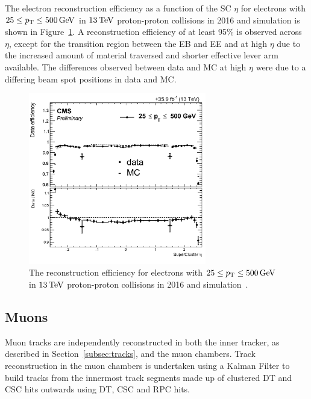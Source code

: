 The electron reconstruction efficiency as a function of the SC $\eta$ for electrons with $25 \leq p_{\mathrm{T}} \leq 500\,\text{Ge\hspace{-.08em}V}$ in $13\,\text{Te\hspace{-.08em}V}$ proton-proton collisions in 2016 and simulation is shown in Figure~\ref{fig:electronRecoEff}.
A reconstruction efficiency of at least 95\% is observed across $\eta$, except for the transition region between the EB and EE and at high $\eta$ due to the increased amount of material traversed and shorter effective lever arm available.
The differences observed between data and MC at high $\eta$ were due to a differing beam spot positions in data and MC.

\begin{figure}[htbp]
\centering
\includegraphics[width=0.69\textwidth]{figs/data-mc/electronGsfRecoEff.pdf}
\caption{The reconstruction efficiency for electrons with $25 \leq p_{\mathrm{T}} \leq 500\,\text{Ge\hspace{-.08em}V}$ in $13\,\text{Te\hspace{-.08em}V}$ proton-proton collisions in 2016 and simulation~\cite{CMS-DP-2017-004}.}
\label{fig:electronRecoEff}
\end{figure}

\subsection{Muons}\label{subsec:objReco-muons}
Muon tracks are independently reconstructed in both the inner tracker, as described in Section~\ref{subsec:tracks}, and the muon chambers.
Track reconstruction in the muon chambers is undertaken using a Kalman Filter to build tracks from the innermost track segments made up of clustered DT and CSC hits outwards using DT, CSC and RPC hits.

